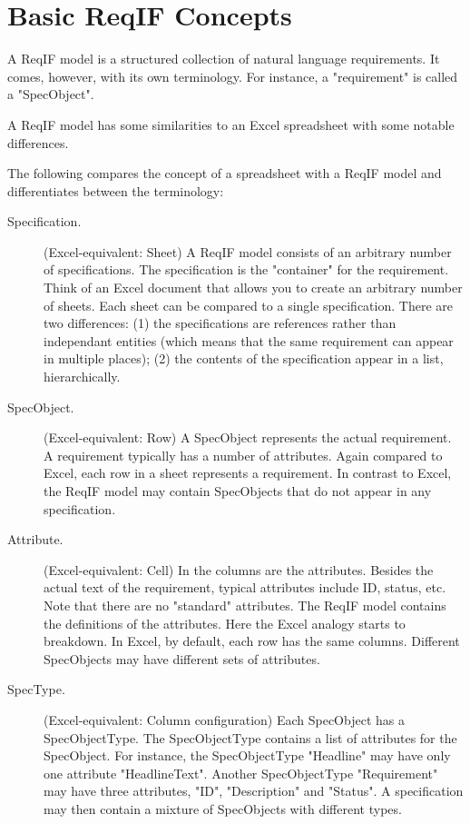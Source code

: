 \section{Basic ReqIF Concepts}

A ReqIF model is a structured collection of natural language requirements.  It comes, however, with its own terminology.  For instance, a "requirement" is called a "SpecObject".

A ReqIF model has some similarities to an Excel spreadsheet with some notable differences.

The following compares the concept of a spreadsheet with a ReqIF model and differentiates between the terminology:

\begin{description}
  \item[Specification.] (Excel-equivalent: Sheet) A ReqIF model consists of an arbitrary number of specifications.  The specification is the "container" for the requirement.  Think of an Excel document that allows you to create an arbitrary number of sheets.  Each sheet can be compared to a single specification.  There are two differences: (1) the specifications are references rather than independant entities (which means that the same requirement can appear in multiple places); (2) the contents of the specification appear in a list, hierarchically.

  \item[SpecObject.] (Excel-equivalent: Row) A SpecObject represents the actual requirement.  A requirement typically has a number of attributes.  Again compared to Excel, each row in a sheet represents a requirement.  In contrast to Excel, the ReqIF model may contain SpecObjects that do not appear in any specification.

  \item[Attribute.] (Excel-equivalent: Cell) In the columns are the attributes.  Besides the actual text of the requirement, typical attributes include ID, status, etc.  Note that there are no "standard" attributes.  The ReqIF model contains the definitions of the attributes.  Here the Excel analogy starts to breakdown.  In Excel, by default, each row has the same columns.  Different SpecObjects may have different sets of attributes.

  \item[SpecType.] (Excel-equivalent: Column configuration) Each SpecObject has a SpecObjectType.  The SpecObjectType contains a list of attributes for the SpecObject.  For instance, the SpecObjectType "Headline" may have only one attribute "HeadlineText".  Another SpecObjectType "Requirement" may have three attributes, "ID", "Description" and "Status".  A specification may then contain a mixture of SpecObjects with different types.

\end{description}

